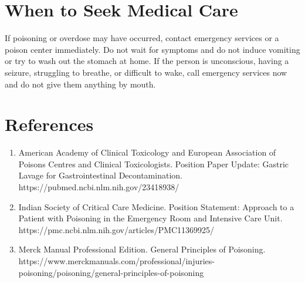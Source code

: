 \section*{When to Seek Medical Care}
If poisoning or overdose may have occurred, contact emergency services or a poison center immediately. Do not wait for symptoms and do not induce vomiting or try to wash out the stomach at home. If the person is unconscious, having a seizure, struggling to breathe, or difficult to wake, call emergency services now and do not give them anything by mouth.

\section*{References}
\begin{enumerate}
  \item American Academy of Clinical Toxicology and European Association of Poisons Centres and Clinical Toxicologists. Position Paper Update: Gastric Lavage for Gastrointestinal Decontamination. https://pubmed.ncbi.nlm.nih.gov/23418938/
  \item Indian Society of Critical Care Medicine. Position Statement: Approach to a Patient with Poisoning in the Emergency Room and Intensive Care Unit. https://pmc.ncbi.nlm.nih.gov/articles/PMC11369925/
  \item Merck Manual Professional Edition. General Principles of Poisoning. https://www.merckmanuals.com/professional/injuries-poisoning/poisoning/general-principles-of-poisoning
\end{enumerate}

\clearpage

